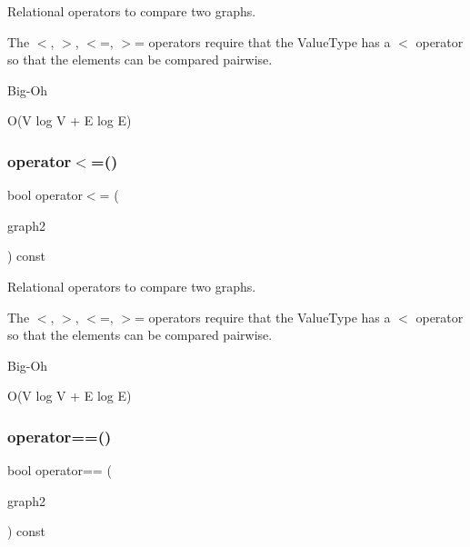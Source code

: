 Relational operators to compare two graphs. 

The $<$, $>$, $<$=, $>$= operators require that the Value\+Type has a $<$ operator so that the elements can be compared pairwise. \begin{DoxyRefDesc}{Big-\/\+Oh}
\item[\mbox{\hyperlink{BigOh__BigOh000095}{Big-\/\+Oh}}]O(V log V + E log E) \end{DoxyRefDesc}
\mbox{\label{classGraph_a352607f2b21dd87b3d2a3957bbf3da7b}} 
\subsubsection{\texorpdfstring{operator$<$=()}{operator<=()}}
{\footnotesize\ttfamily bool operator$<$= (\begin{DoxyParamCaption}\item[{const \mbox{\hyperlink{classGraph}{Graph}}$<$ \mbox{\hyperlink{classVertexGen}{Vertex\+Gen}}$<$ V, E $>$, Edge\+Gen$<$ V, E $>$ $>$ \&}]{graph2 }\end{DoxyParamCaption}) const\hspace{0.3cm}{\ttfamily [inherited]}}



Relational operators to compare two graphs. 

The $<$, $>$, $<$=, $>$= operators require that the Value\+Type has a $<$ operator so that the elements can be compared pairwise. \begin{DoxyRefDesc}{Big-\/\+Oh}
\item[\mbox{\hyperlink{BigOh__BigOh000096}{Big-\/\+Oh}}]O(V log V + E log E) \end{DoxyRefDesc}
\mbox{\label{classGraph_a188f85939e3fe6ed2d411f622287f722}} 
\subsubsection{\texorpdfstring{operator==()}{operator==()}}
{\footnotesize\ttfamily bool operator== (\begin{DoxyParamCaption}\item[{const \mbox{\hyperlink{classGraph}{Graph}}$<$ \mbox{\hyperlink{classVertexGen}{Vertex\+Gen}}$<$ V, E $>$, Edge\+Gen$<$ V, E $>$ $>$ \&}]{graph2 }\end{DoxyParamCaption}) const\hspace{0.3cm}{\ttfamily [inherited]}}



